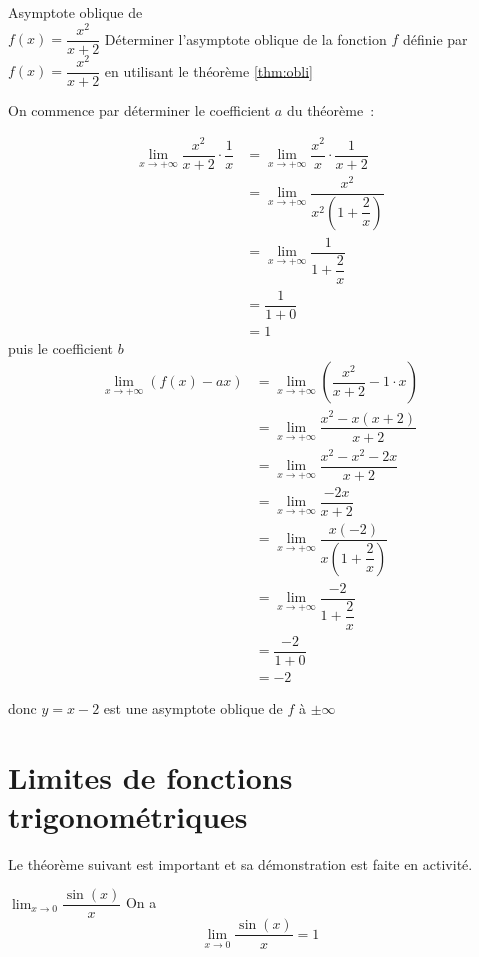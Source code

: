 \documentclass[a4paper,12pt]{article}
\begin{document}
\begin{exemple}
	Asymptote oblique de\\
	\medskip
	$f(x)=\dfrac{x^2}{x+2}$
	\tcblower
Déterminer l'asymptote oblique de la fonction $f$ définie par $f(x) = \dfrac{x^2}{x+2}$ en utilisant le théorème \ref{thm:obli}

On commence par déterminer le coefficient $a$ du théorème~:

\begin{align*}
\displaystyle\lim_{x \to +\infty} \dfrac{x^2}{x+2} \cdot \dfrac{1}{x} &= \displaystyle\lim_{x \to +\infty} \dfrac{x^2}{x} \cdot \dfrac{1}{x+2}\\	
&= \displaystyle\lim_{x \to +\infty} \dfrac{x^2}{x^2(1+\dfrac{2}{x})}\\
&= \displaystyle\lim_{x \to +\infty} \dfrac{1}{1+\dfrac{2}{x}}\\
&= \dfrac{1}{1+0} \\
&= 1
\end{align*}
puis le coefficient $b$
\begin{align*}
\displaystyle\lim_{x \to +\infty} (f(x) - ax) &= \displaystyle\lim_{x \to +\infty} \left(\dfrac{x^2}{x+2} - 1 \cdot x\right)\\
					      &= \displaystyle\lim_{x \to +\infty} \dfrac{x^2 - x(x+2)}{x+2}\\
					      &= \displaystyle\lim_{x \to +\infty} \dfrac{x^2 - x^2 - 2x}{x+2}\\ 
					      &= \displaystyle\lim_{x \to +\infty} \dfrac{-2x}{x+2} \\
&= \displaystyle\lim_{x \to +\infty} \dfrac{x(-2)}{x(1+\dfrac{2}{x})}\\
&= \displaystyle\lim_{x \to +\infty} \dfrac{-2}{1+\dfrac{2}{x}} \\
&= \dfrac{-2}{1+0} \\
&= -2
\end{align*}

donc $y = x - 2$ est une asymptote oblique de $f$ à $\pm\infty$

\end{exemple}
\section{Limites de fonctions trigonométriques}
Le théorème suivant est important et sa démonstration est faite en activité. 
\medskip
\begin{thm}[label=thm:sinxx]
	\smallskip
$\displaystyle\lim_{x \to 0} \dfrac{\sin(x)}{x}$
	\tcblower
On a  \[\displaystyle\lim_{x \to 0} \dfrac{\sin(x)}{x} = 1\]
\end{thm}
\end{document}
